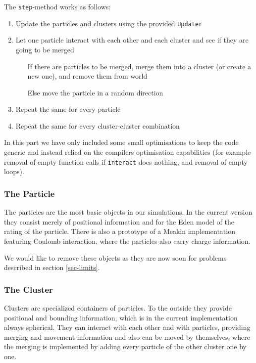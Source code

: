 \documentclass[twocolumn,10pt]{scrartcl}
\begin{document}
                The \lstinline!step!-method works as follows:
                \begin{enumerate}
                    \item Update the particles and clusters using the provided \lstinline!Updater!
                    \item Let one particle interact with each other and each cluster and see if they are going to be
                        merged
                        \begin{itemize}
                            \item[If] there are particles to be merged, merge them into a cluster (or create a new one),
                                and remove them from world
                            \item[Else] move the particle in a random direction
                        \end{itemize}
                    \item Repeat the same for every particle
                    \item Repeat the same for every cluster-cluster combination
                \end{enumerate}
                In this part we have only included some small optimisations to keep the code generic and instead relied
                on the compilers optimisation capabilities (for example removal of empty function calls if
                \lstinline'interact' does nothing, and removal of empty loops).

            \subsubsection*{The Particle}
                The particles are the most basic objects in our simulations. In the current version they consist merely
                of positional information and for the Eden model of the rating of the particle. There is also a
                prototype of a Meakin implementation featuring Coulomb interaction, where the particles also carry
                charge information.

                We would like to remove these objects as they are now soon for problems described in section
                \ref{sec-limits}.

            \subsubsection{The Cluster}
                Clusters are specialized containers of particles. To the outside they provide positional and bounding
                information, which is in the current implementation always spherical. They can interact with each other
                and with particles, providing merging and movement information and also can be moved by themselves,
                where the merging is implemented by adding every particle of the other cluster one by one.
            
\end{document}
